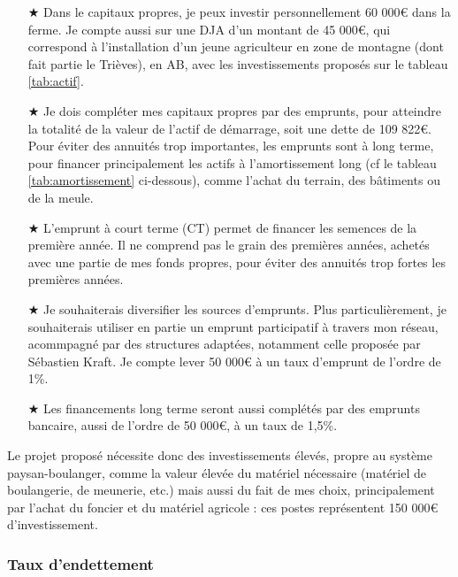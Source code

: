 \documentclass{book}
\begin{document}
\begin{itemize}

	\item[$\bigstar$] Dans le capitaux propres, je peux investir personnellement 60 000\euro{} dans la ferme. Je compte aussi sur une DJA d'un montant de 45 000\euro{}, qui correspond à l'installation d'un jeune agriculteur en zone de montagne (dont fait partie le Trièves), en AB, avec les investissements proposés sur le tableau \ref{tab:actif}.
	
	\item[$\bigstar$] Je dois compléter mes capitaux propres par des emprunts, pour atteindre la totalité de la valeur de l'actif de démarrage, soit une dette de 109 822\euro{}. Pour éviter des annuités trop importantes, les emprunts sont à long terme, pour financer principalement les actifs à l'amortissement long (cf le tableau \ref{tab:amortissement} ci-dessous), comme l'achat du terrain, des bâtiments ou de la meule. 
	
	\item[$\bigstar$] L'emprunt à court terme (CT) permet de financer les semences de la première année. Il ne comprend pas le grain des premières années, achetés avec une partie de mes fonds propres, pour éviter des annuités trop fortes les premières années.
	
	\item[$\bigstar$] Je souhaiterais diversifier les sources d'emprunts. Plus particulièrement, je souhaiterais utiliser en partie un emprunt participatif à travers mon réseau, acommpagné par des structures adaptées, notamment celle proposée par Sébastien Kraft. Je compte lever 50 000\euro{} à un taux d'emprunt de l'ordre de 1\%.
	
	\item[$\bigstar$] Les financements long terme seront aussi complétés par des emprunts bancaire, aussi de l'ordre de 50 000\euro{}, à un taux de 1,5\%.

\end{itemize}

Le projet proposé nécessite donc des investissements élevés, propre au système paysan-boulanger, comme la valeur élevée du matériel nécessaire (matériel de boulangerie, de meunerie, etc.) mais aussi du fait de mes choix, principalement par l'achat du foncier et du matériel agricole : ces postes représentent 150 000\euro{} d'investissement.

\subsubsection{Taux d'endettement}
\end{document}
